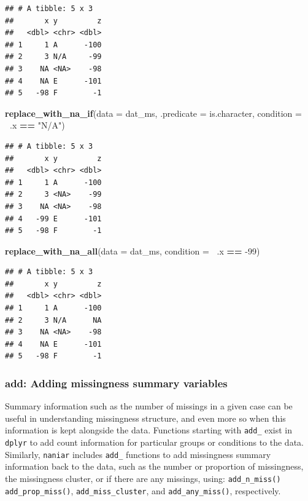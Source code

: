 \documentclass[]{article}
\newenvironment{Shaded}{\begin{snugshade}}{\end{snugshade}}
\newcommand{\DataTypeTok}[1]{\textcolor[rgb]{0.13,0.29,0.53}{#1}}
\newcommand{\DecValTok}[1]{\textcolor[rgb]{0.00,0.00,0.81}{#1}}
\newcommand{\KeywordTok}[1]{\textcolor[rgb]{0.13,0.29,0.53}{\textbf{#1}}}
\newcommand{\NormalTok}[1]{#1}
\newcommand{\OperatorTok}[1]{\textcolor[rgb]{0.81,0.36,0.00}{\textbf{#1}}}
\newcommand{\StringTok}[1]{\textcolor[rgb]{0.31,0.60,0.02}{#1}}
\theoremstyle{definition}
\theoremstyle{definition}
\theoremstyle{definition}
\theoremstyle{remark}
\begin{document}
\begin{verbatim}
## # A tibble: 5 x 3
##       x y         z
##   <dbl> <chr> <dbl>
## 1     1 A      -100
## 2     3 N/A     -99
## 3    NA <NA>    -98
## 4    NA E      -101
## 5   -98 F        -1
\end{verbatim}

\begin{Shaded}
\begin{Highlighting}[]
\KeywordTok{replace_with_na_if}\NormalTok{(}\DataTypeTok{data =}\NormalTok{ dat_ms,}
                 \DataTypeTok{.predicate =}\NormalTok{ is.character,}
                 \DataTypeTok{condition =} \OperatorTok{~}\NormalTok{.x }\OperatorTok{==}\StringTok{ "N/A"}\NormalTok{)}
\end{Highlighting}
\end{Shaded}

\begin{verbatim}
## # A tibble: 5 x 3
##       x y         z
##   <dbl> <chr> <dbl>
## 1     1 A      -100
## 2     3 <NA>    -99
## 3    NA <NA>    -98
## 4   -99 E      -101
## 5   -98 F        -1
\end{verbatim}

\begin{Shaded}
\begin{Highlighting}[]
\KeywordTok{replace_with_na_all}\NormalTok{(}\DataTypeTok{data =}\NormalTok{ dat_ms,}
                    \DataTypeTok{condition =} \OperatorTok{~}\NormalTok{.x }\OperatorTok{==}\StringTok{ }\DecValTok{-99}\NormalTok{)}
\end{Highlighting}
\end{Shaded}

\begin{verbatim}
## # A tibble: 5 x 3
##       x y         z
##   <dbl> <chr> <dbl>
## 1     1 A      -100
## 2     3 N/A      NA
## 3    NA <NA>    -98
## 4    NA E      -101
## 5   -98 F        -1
\end{verbatim}

\hypertarget{verbs-add-cols}{%
\subsubsection{add: Adding missingness summary
variables}\label{verbs-add-cols}}

Summary information such as the number of missings in a given case can
be useful in understanding missingness structure, and even more so when
this information is kept alongside the data. Functions starting with
\texttt{add\_} exist in \texttt{dplyr} to add count information for
particular groups or conditions to the data. Similarly, \texttt{naniar}
includes \texttt{add\_} functions to add missingness summary information
back to the data, such as the number or proportion of missingness, the
missingness cluster, or if there are any missings, using:
\texttt{add\_n\_miss()} \texttt{add\_prop\_miss()},
\texttt{add\_miss\_cluster}, and \texttt{add\_any\_miss()},
respectively.
\end{document}
